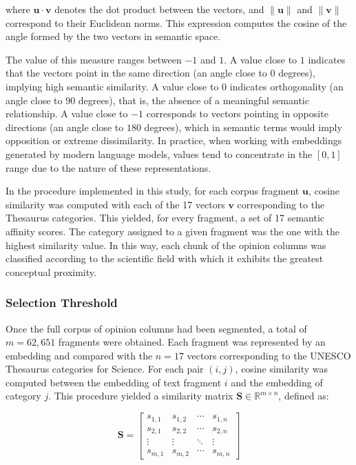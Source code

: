 \documentclass[pdflatex,sn-mathphys-num,iicol]{sn-jnl}
\begin{document}
	
	where $\mathbf{u} \cdot \mathbf{v}$ denotes the dot product between the vectors, and $\lVert \mathbf{u} \rVert$ and $\lVert \mathbf{v} \rVert$ correspond to their Euclidean norms. This expression computes the cosine of the angle formed by the two vectors in semantic space.
	
	The value of this measure ranges between $-1$ and $1$. A value close to $1$ indicates that the vectors point in the same direction (an angle close to $0$ degrees), implying high semantic similarity. A value close to $0$ indicates orthogonality (an angle close to $90$ degrees), that is, the absence of a meaningful semantic relationship. A value close to $-1$ corresponds to vectors pointing in opposite directions (an angle close to $180$ degrees), which in semantic terms would imply opposition or extreme dissimilarity. In practice, when working with embeddings generated by modern language models, values tend to concentrate in the $[0,1]$ range due to the nature of these representations.
	
	In the procedure implemented in this study, for each corpus fragment $\mathbf{u}$, cosine similarity was computed with each of the 17 vectors $\mathbf{v}$ corresponding to the Thesaurus categories. This yielded, for every fragment, a set of 17 semantic affinity scores. The category assigned to a given fragment was the one with the highest similarity value. In this way, each chunk of the opinion columns was classified according to the scientific field with which it exhibits the greatest conceptual proximity.
	 
	
	\subsubsection{Selection Threshold}\label{subsubsec:threshold}
	
	Once the full corpus of opinion columns had been segmented, a total of $m = 62{,}651$ fragments were obtained. Each fragment was represented by an embedding and compared with the $n = 17$ vectors corresponding to the UNESCO Thesaurus categories for Science. For each pair $(i,j)$, cosine similarity was computed between the embedding of text fragment $i$ and the embedding of category $j$. This procedure yielded a similarity matrix $\mathbf{S} \in \mathbb{R}^{m \times n}$, defined as:
	
	
	\begin{equation}
		\mathbf{S} =
		\begin{bmatrix}
			s_{1,1} & s_{1,2} & \cdots & s_{1,n} \\
			s_{2,1} & s_{2,2} & \cdots & s_{2,n} \\
			\vdots  & \vdots  & \ddots & \vdots  \\
			s_{m,1} & s_{m,2} & \cdots & s_{m,n}
		\end{bmatrix}
		\label{eq:matrix}
	\end{equation}
	
\end{document}

